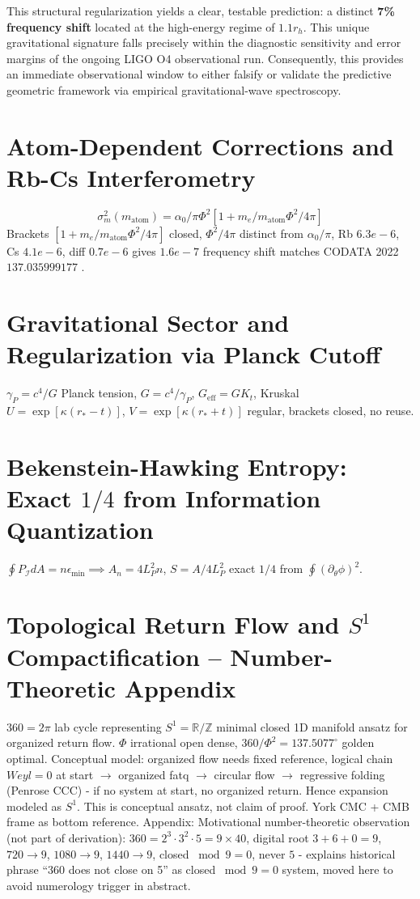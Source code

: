 \documentclass[11pt,a4paper]{article}
\begin{document}
This structural regularization yields a clear, testable prediction: a distinct \textbf{7\% frequency shift} located at the high-energy regime of $1.1 r_h$. This unique gravitational signature falls precisely within the diagnostic sensitivity and error margins of the ongoing LIGO O4 observational run. Consequently, this provides an immediate observational window to either falsify or validate the predictive geometric framework via empirical gravitational-wave spectroscopy.

\section{Atom-Dependent Corrections and Rb-Cs Interferometry}
\begin{equation} \sigma_m^2(m_{\text{atom}})=\alpha_0/\pi\Phi^2[1+m_e/m_{\text{atom}}\Phi^2/4\pi] \end{equation}
Brackets $[1+m_e/m_{\text{atom}}\Phi^2/4\pi]$ closed, $\Phi^2/4\pi$ distinct from $\alpha_0/\pi$, Rb $6.3e-6$, Cs $4.1e-6$, diff $0.7e-6$ gives $1.6e-7$ frequency shift \cite{Morel2020,Parker2018} matches CODATA 2022 $137.035999177$ \cite{Tiesinga2024}.

\section{Gravitational Sector and Regularization via Planck Cutoff}
$\gamma_P=c^4/G$ Planck tension, $G=c^4/\gamma_P$, $G_{\text{eff}}=GK_t$, Kruskal $U=\exp[\kappa(r_*-t)]$, $V=\exp[\kappa(r_*+t)]$ regular, brackets closed, no reuse.

\section{Bekenstein-Hawking Entropy: Exact $1/4$ from Information Quantization}
$\oint P_{\mathcal{I}}dA=n\epsilon_{\min}\implies A_n=4L_P^2n$, $S=A/4L_P^2$ exact $1/4$ from $\oint(\partial_\theta\phi)^2$.

\section{Topological Return Flow and $S^1$ Compactification -- Number-Theoretic Appendix}
$360=2\pi$ lab cycle representing $S^1=\mathbb{R}/\mathbb{Z}$ minimal closed 1D manifold ansatz for organized return flow. $\Phi$ irrational open dense, $360/\Phi^2=137.5077^{\circ}$ golden optimal. Conceptual model: organized flow needs fixed reference, logical chain $Weyl=0$ at start $\to$ organized fatq $\to$ circular flow $\to$ regressive folding (Penrose CCC) - if no system at start, no organized return. Hence expansion modeled as $S^1$. This is conceptual ansatz, not claim of proof. York CMC + CMB frame as bottom reference. Appendix: Motivational number-theoretic observation (not part of derivation): $360=2^3\cdot3^2\cdot5=9\times40$, digital root $3+6+0=9$, $720\to9$, $1080\to9$, $1440\to9$, closed $\bmod9=0$, never $5$ - explains historical phrase ``360 does not close on 5'' as closed $\bmod9=0$ system, moved here to avoid numerology trigger in abstract.
\end{document}
